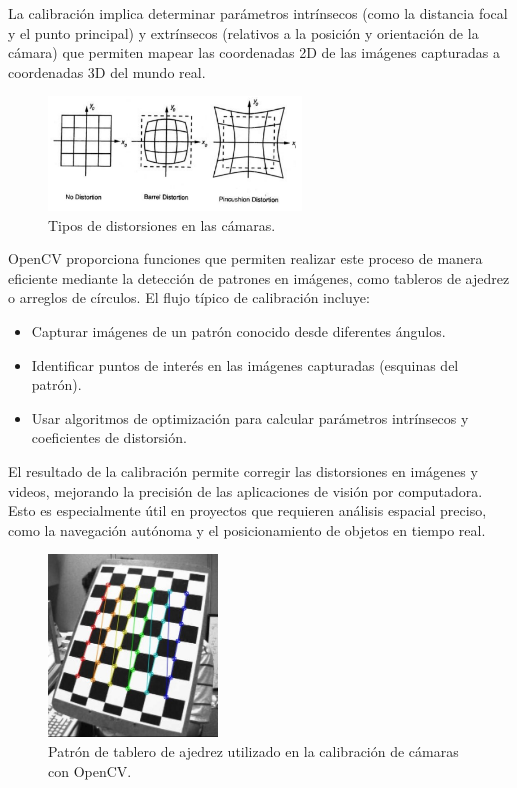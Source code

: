     La calibración implica determinar parámetros intrínsecos (como la distancia focal y el punto principal) y extrínsecos (relativos a la posición y orientación de la cámara) que permiten mapear las coordenadas 2D de las imágenes capturadas a coordenadas 3D del mundo real.  
    
    \begin{figure}[h!] 
        \centering 
        \includegraphics[width=0.6\textwidth]{pictures/distortions.png} %
        \caption{Tipos de distorsiones en las cámaras.} 
        \label{fig:distortions} 
    \end{figure}  
    
    OpenCV proporciona funciones que permiten realizar este proceso de manera eficiente mediante la detección de patrones en imágenes, como tableros de ajedrez o arreglos de círculos. El flujo típico de calibración incluye:  
    
    \begin{itemize}
        \item Capturar imágenes de un patrón conocido desde diferentes ángulos.  
        \item Identificar puntos de interés en las imágenes capturadas (esquinas del patrón).  
        \item Usar algoritmos de optimización para calcular parámetros intrínsecos y coeficientes de distorsión.  
    \end{itemize}  
    
    El resultado de la calibración permite corregir las distorsiones en imágenes y videos, mejorando la precisión de las aplicaciones de visión por computadora. Esto es especialmente útil en proyectos que requieren análisis espacial preciso, como la navegación autónoma y el posicionamiento de objetos en tiempo real.  
    
    \begin{figure}[h!] 
        \centering 
        \includegraphics[width=0.4\textwidth]{pictures/calib_pattern.jpg} %
        \caption{Patrón de tablero de ajedrez utilizado en la calibración de cámaras con OpenCV.} 
        \label{fig:calib_pattern} 
    \end{figure}  

